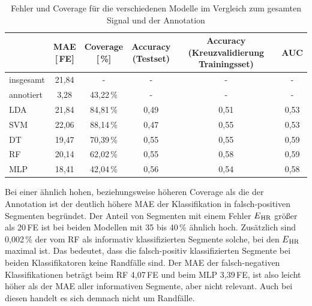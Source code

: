 \begin{table}[H]
	\centering
 	\begin{tabular}{l || c | c | c | c | c}
 					& \makecell{\ac{MAE}\\{[\,\si{FE}]}}	& \makecell{Coverage\\{[\,\%]}}	& \makecell{Accuracy\\(Testset)}	& \makecell{Accuracy\\(Kreuzvalidierung Trainingsset)}	& AUC\\ \hline
 		insgesamt 	& 21{,}84				& -				& - 									& -														& -\\
 		annotiert	& 3{,}28					& 43{,}22\,\%	& - 									& -														& -\\ \hline
 		\acs{LDA}	& 21{,}84				& 84{,}81\,\%	& 0{,}49								& 0{,}51												& 0,53\\
 		\acs{SVM}	& 22{,}06				& 88{,}14\,\%	& 0{,}47								& 0{,}55												& 0,53\\
 		\acs{DT}	& 19{,}47				& 70{,}39\,\%	& 0{,}55								& 0{,}55												& 0,59\\
 		\acs{RF}	& 20{,}14				& 62{,}02\,\%	& 0{,}55								& 0{,}58												& 0,59\\
 		\acs{MLP}	& 18{,}41				& 42{,}04\,\%	& 0{,}56								& 0{,}54												& 0,58\\
 	\end{tabular}
 	\caption[Fehler und Coverage der Klassifikation für die verschiedenen Modellen des maschinellen Lernens mit statistischen Merkmalen im Vergleich um gesamten Signal und der Annotation]{Fehler und Coverage für die verschiedenen Modelle im Vergleich zum gesamten Signal und der Annotation}
 	\label{fig:ml-statistical-MAE-Coverage}
\end{table}

Bei einer ähnlich hohen, beziehungsweise höheren Coverage als die der Annotation ist der deutlich höhere \ac{MAE} der Klassifikation in falsch-positiven Segmenten begründet. Der Anteil von Segmenten mit einem Fehler $E\textsubscript{HR}$ größer als 20\,\si{FE} ist bei beiden Modellen mit 35 bis 40\,\% ähnlich hoch. Zusätzlich sind 0{,}002\,\% der vom \ac{RF} als informativ klassifizierten Segmente solche, bei den $E\textsubscript{HR}$ maximal ist. Das bedeutet, dass die falsch-positiv klassifizierten Segmente bei beiden Klassifikatoren keine Randfälle sind. Der \ac{MAE} der falsch-negativen Klassifikationen beträgt beim \ac{RF} 4,07\,\si{FE} und beim \ac{MLP} 3{,}39\,\si{FE}, ist also leicht höher als der \ac{MAE} aller informativen Segmente, aber nicht relevant. Auch bei diesen handelt es sich demnach nicht um Randfälle.
 	
